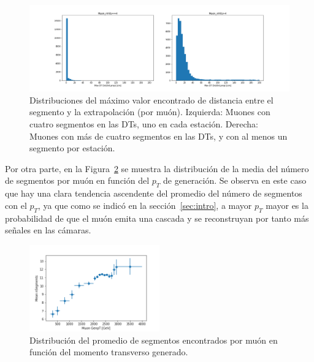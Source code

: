 \begin{figure}[h]
\centering
\includegraphics[width=1.0\textwidth]{figures/data_simple_dist_postCleaning.png}
\caption{Distribuciones del m\'aximo valor encontrado de distancia entre el segmento y la extrapolaci\'on (por mu\'on). Izquierda: Muones con cuatro segmentos en las DTs, uno en cada estaci\'on. Derecha: Muones con m\'as de cuatro segmentos en las DTs, y con al menos un segmento por estaci\'on.}
\label{fig:data_dist}        
\end{figure}


Por otra parte, en la Figura~\ref{fig:data_nSegmentsMean} se muestra la distribuci\'on de la media del n\'umero de segmentos por mu\'on en funci\'on del $p_{T}$ de generaci\'on. Se observa en este caso que hay una clara tendencia ascendente del promedio del n\'umero de segmentos con el $p_{T}$, ya que como se indic\'o en la secci\'on~\ref{sec:intro}, a mayor $p_{T}$ mayor es la probabilidad de que el mu\'on emita una cascada y se reconstruyan por tanto m\'as señales en las c\'amaras.


\begin{figure}[h]
\centering
\includegraphics[width=0.5\textwidth]{figures/data_simple_genpt_MeanNSegments.png}
\caption{Distribuci\'on del promedio de segmentos encontrados por mu\'on en funci\'on del momento transverso generado.}
\label{fig:data_nSegmentsMean}        
\end{figure}
